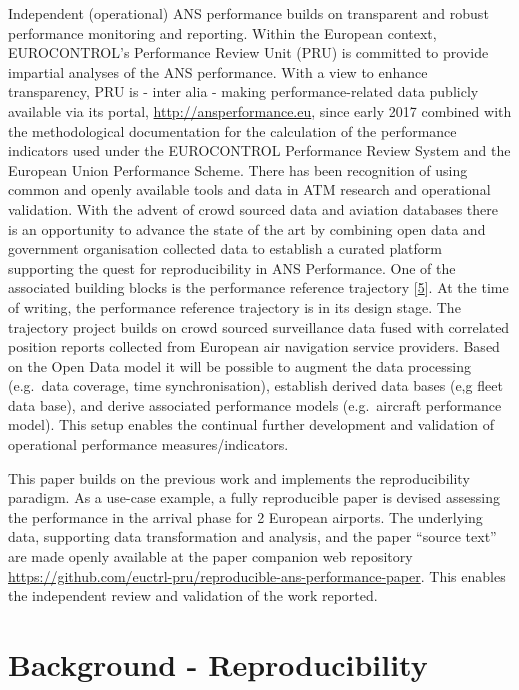 \documentclass[conference,final,a4paper,]{IEEEtran}
\begin{document}
Independent (operational) ANS performance builds on transparent and robust performance monitoring and reporting.
Within the European context, EUROCONTROL's Performance Review Unit (PRU) is committed to provide impartial analyses of the ANS performance.
With a view to enhance transparency, PRU is - inter alia - making performance-related data publicly available via its portal, \url{http://ansperformance.eu}, since early 2017 combined with the methodological documentation for the calculation of the performance indicators used under the EUROCONTROL Performance Review System and the European Union Performance Scheme.
There has been recognition of using common and openly available tools and data in ATM research and operational validation.
With the advent of crowd sourced data and aviation databases there is an opportunity to advance the state of the art by combining open data and government organisation collected data to establish a curated platform supporting the quest for reproducibility in ANS Performance.
One of the associated building blocks is the performance reference trajectory {[}\protect\hyperlink{ref-spinielli_2018}{5}{]}.
At the time of writing, the performance reference trajectory is in its design stage. The trajectory project builds on crowd sourced surveillance data fused with correlated position reports collected from European air navigation service providers.
Based on the Open Data model it will be possible to augment the data processing (e.g.~data coverage, time synchronisation), establish derived data bases (e,g fleet data base), and derive associated performance models (e.g.~aircraft performance model).
This setup enables the continual further development and validation of operational performance measures/indicators.

This paper builds on the previous work and implements the reproducibility paradigm.
As a use-case example, a fully reproducible paper is devised assessing the performance in the arrival phase for 2 European airports.
The underlying data, supporting data transformation and analysis, and the paper ``source text'' are made openly available at the paper companion web repository \url{https://github.com/euctrl-pru/reproducible-ans-performance-paper}.
This enables the independent review and validation of the work reported.

\hypertarget{background---reproducibility}{%
\section{Background - Reproducibility}\label{background---reproducibility}}
\end{document}
